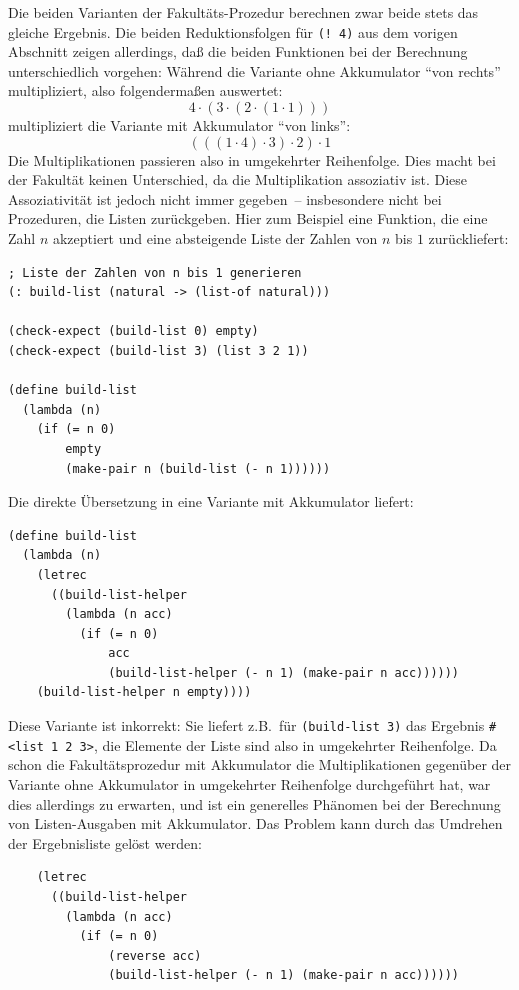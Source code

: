 Die beiden Varianten der Fakultäts-Prozedur berechnen zwar beide 
stets das gleiche Ergebnis.  Die beiden Reduktionsfolgen für
\texttt{(! 4)} aus dem vorigen Abschnitt zeigen allerdings, daß die
beiden Funktionen bei der Berechnung unterschiedlich vorgehen:
Während die Variante ohne Akkumulator "`von rechts"' multipliziert,
also folgendermaßen auswertet:
%
\begin{displaymath}
  4\cdot (3 \cdot (2 \cdot (1 \cdot 1)))
\end{displaymath}
%
multipliziert die Variante mit Akkumulator "`von links"':
%
\begin{displaymath}
  (((1 \cdot 4)\cdot 3)\cdot 2)\cdot 1
\end{displaymath}
%
Die Multiplikationen passieren also in umgekehrter Reihenfolge.
Dies macht bei der Fakultät keinen Unterschied, da die Multiplikation
assoziativ ist.  Diese Assoziativität ist jedoch nicht immer
gegeben~-- insbesondere nicht bei Prozeduren, die Listen zurückgeben.
Hier zum Beispiel eine Funktion, die eine Zahl $n$ akzeptiert und eine
absteigende Liste der Zahlen von $n$ bis $1$ zurückliefert:
%
\begin{verbatim}
; Liste der Zahlen von n bis 1 generieren
(: build-list (natural -> (list-of natural)))

(check-expect (build-list 0) empty)
(check-expect (build-list 3) (list 3 2 1))

(define build-list
  (lambda (n)
    (if (= n 0)
        empty
        (make-pair n (build-list (- n 1))))))
\end{verbatim}
%
Die direkte Übersetzung in eine Variante mit Akkumulator liefert:
%
\begin{verbatim}
(define build-list
  (lambda (n)
    (letrec
      ((build-list-helper
        (lambda (n acc)
          (if (= n 0)
              acc
              (build-list-helper (- n 1) (make-pair n acc))))))
    (build-list-helper n empty))))
\end{verbatim}
%
Diese Variante ist inkorrekt: Sie liefert z.B.\ für
\texttt{(build-list 3)} das Ergebnis \verb|#<list 1 2 3>|, die
Elemente der Liste sind also in umgekehrter Reihenfolge.  Da schon die
Fakultätsprozedur mit Akkumulator die Multiplikationen gegenüber der
Variante ohne Akkumulator in umgekehrter Reihenfolge durchgeführt hat, war dies allerdings zu
erwarten, und ist ein generelles Phänomen bei der Berechnung von
Listen-Ausgaben mit Akkumulator.  Das Problem kann durch das Umdrehen
der Ergebnisliste gelöst werden:
%
\begin{verbatim}
    (letrec
      ((build-list-helper
        (lambda (n acc)
          (if (= n 0)
              (reverse acc)
              (build-list-helper (- n 1) (make-pair n acc))))))
\end{verbatim}
%


